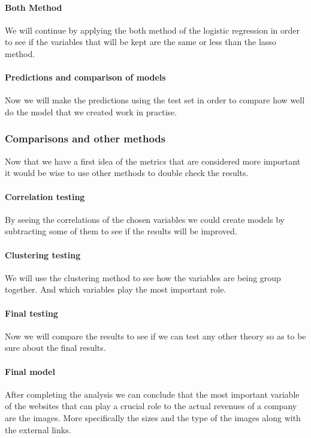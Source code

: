 \documentclass{article}
\begin{document}
\paragraph{Both Method}
We will continue by applying the both method of the logistic regression in order to see if the variables that will be kept are the same or less than the lasso method.
\paragraph{Predictions and comparison of models}
Now we will make the predictions using the test set in order to compare how well do the model that we created work in practise.
\subsubsection{Comparisons and other methods}
Now that we have a first idea of the metrics that are considered more important it would be wise to use other methods to double check the results.
\paragraph{Correlation testing}
By seeing the correlations of the chosen variables we could create models by subtracting some of them to see if the results will be improved.
\paragraph{Clustering testing}
We will use the clustering method to see how the variables are being group together. And which variables play the most important role.
\paragraph{Final testing}
Now we will compare the results to see if we can test any other theory so as to be sure about the final results.
\paragraph{Final model}
After completing the analysis we can conclude that the most important variable of the websites that can play a crucial role to the actual revenues of a company are the images. More specifically the sizes and the type of the images along with the external links.
\pagebreak  
\end{document}
